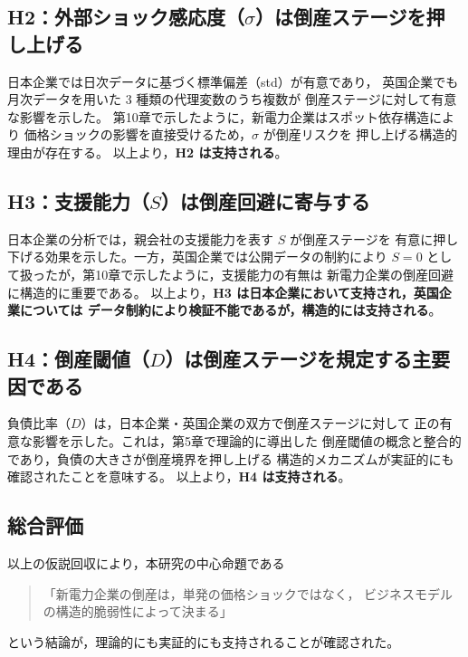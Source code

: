 \subsection*{H2：外部ショック感応度（$\sigma$）は倒産ステージを押し上げる}

日本企業では日次データに基づく標準偏差（std）が有意であり，
英国企業でも月次データを用いた 3 種類の代理変数のうち複数が
倒産ステージに対して有意な影響を示した。
第10章で示したように，新電力企業はスポット依存構造により
価格ショックの影響を直接受けるため，$\sigma$ が倒産リスクを
押し上げる構造的理由が存在する。
以上より，\textbf{H2 は支持される}。

\subsection*{H3：支援能力（$S$）は倒産回避に寄与する}

日本企業の分析では，親会社の支援能力を表す $S$ が倒産ステージを
有意に押し下げる効果を示した。一方，英国企業では公開データの制約により
$S=0$ として扱ったが，第10章で示したように，支援能力の有無は
新電力企業の倒産回避に構造的に重要である。
以上より，\textbf{H3 は日本企業において支持され，英国企業については
データ制約により検証不能であるが，構造的には支持される}。

\subsection*{H4：倒産閾値（$D$）は倒産ステージを規定する主要因である}

負債比率（$D$）は，日本企業・英国企業の双方で倒産ステージに対して
正の有意な影響を示した。これは，第5章で理論的に導出した
倒産閾値の概念と整合的であり，負債の大きさが倒産境界を押し上げる
構造的メカニズムが実証的にも確認されたことを意味する。
以上より，\textbf{H4 は支持される}。

\subsection*{総合評価}

以上の仮説回収により，本研究の中心命題である

\begin{quote}
「新電力企業の倒産は，単発の価格ショックではなく，
ビジネスモデルの構造的脆弱性によって決まる」
\end{quote}

という結論が，理論的にも実証的にも支持されることが確認された。


